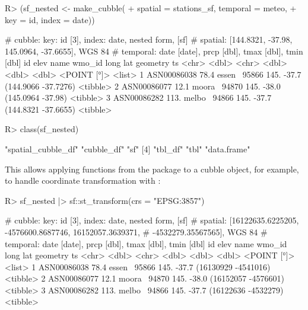 \documentclass[
  shortnames]{jss}
\begin{document}
\begin{CodeChunk}
\begin{CodeInput}
R> (sf_nested <- make_cubble(
+   spatial = stations_sf, temporal = meteo, 
+   key = id, index = date))
\end{CodeInput}
\begin{CodeOutput}
# cubble:   key: id [3], index: date, nested form, [sf]
# spatial:  [144.8321, -37.98, 145.0964, -37.6655], WGS 84
# temporal: date [date], prcp [dbl], tmax [dbl], tmin [dbl]
  id           elev name   wmo_id  long   lat            geometry ts      
  <chr>       <dbl> <chr>   <dbl> <dbl> <dbl>         <POINT [°]> <list>  
1 ASN00086038  78.4 essen~  95866  145. -37.7 (144.9066 -37.7276) <tibble>
2 ASN00086077  12.1 moora~  94870  145. -38.0   (145.0964 -37.98) <tibble>
3 ASN00086282 113.  melbo~  94866  145. -37.7 (144.8321 -37.6655) <tibble>
\end{CodeOutput}
\begin{CodeInput}
R> class(sf_nested)
\end{CodeInput}
\begin{CodeOutput}
[1] "spatial_cubble_df" "cubble_df"         "sf"               
[4] "tbl_df"            "tbl"               "data.frame"       
\end{CodeOutput}
\end{CodeChunk}

This allows applying functions from the  package to a cubble object, for example, to handle coordinate transformation with :

\begin{CodeChunk}
\begin{CodeInput}
R> sf_nested |> sf::st_transform(crs = "EPSG:3857")
\end{CodeInput}
\begin{CodeOutput}
# cubble:   key: id [3], index: date, nested form, [sf]
# spatial:  [16122635.6225205, -4576600.8687746, 16152057.3639371,
#   -4532279.35567565], WGS 84
# temporal: date [date], prcp [dbl], tmax [dbl], tmin [dbl]
  id           elev name   wmo_id  long   lat            geometry ts      
  <chr>       <dbl> <chr>   <dbl> <dbl> <dbl>         <POINT [°]> <list>  
1 ASN00086038  78.4 essen~  95866  145. -37.7 (16130929 -4541016) <tibble>
2 ASN00086077  12.1 moora~  94870  145. -38.0 (16152057 -4576601) <tibble>
3 ASN00086282 113.  melbo~  94866  145. -37.7 (16122636 -4532279) <tibble>
\end{CodeOutput}
\end{CodeChunk}
\end{document}
